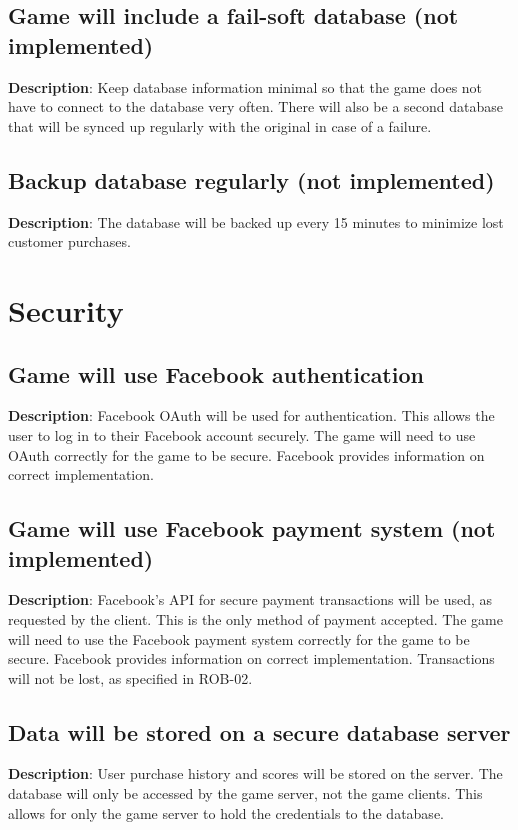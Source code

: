 \subsection{Game will include a fail-soft database (not implemented)}
\textbf{Description}: Keep database information minimal so that the game does
not have to connect to the database very often. There will also be
a second database that will be synced up regularly with the original
in case of a failure.

\subsection{Backup database regularly (not implemented)}
\textbf{Description}: The database will be backed up every 15 minutes to minimize
lost customer purchases.

\section{Security}
\renewcommand\thesubsection{SEC-%
\ifnum\value{subsection}<10 0\fi
\arabic{subsection}}
\subsection{Game will use Facebook authentication}
\textbf{Description}: Facebook OAuth will be used for authentication. This
allows the user to log in to their Facebook account securely. The
game will need to use OAuth correctly for the game to be secure. Facebook
provides information on correct implementation.

\subsection{Game will use Facebook payment system (not implemented)}
\textbf{Description}: Facebook\textquoteright{}s API for secure payment transactions
will be used, as requested by the client. This is the only method
of payment accepted. The game will need to use the Facebook payment
system correctly for the game to be secure. Facebook provides information
on correct implementation. Transactions will not be lost, as specified
in ROB-02.

\subsection{Data will be stored on a secure database server}
\textbf{Description}: User purchase history and scores will be stored on the
server. The database will only be accessed by the game server, not
the game clients. This allows for only the game server to hold the
credentials to the database. 

